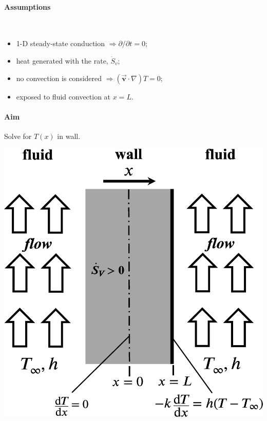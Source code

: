 \documentclass[12pt, a4paper]{article}
\numberwithin{equation}{subsection}
\begin{document}
\begin{tcolorbox}[breakable, title = \textbf{Example: Internal Heat Generation}]
\begin{minipage}{.6\textwidth}
    \paragraph{Assumptions} \ \\
    \begin{itemize}
        \item 1-D steady-state conduction  $\Rightarrow \partial / \partial t = 0$;
        \item heat generated with the rate, $\dot{S}_{v}$;
        \item no convection is considered $\Rightarrow (\vec{\bm{v}} \cdot \nabla) T = 0$;
        \item exposed to fluid convection at $x=L$.
    \end{itemize}
    \paragraph{Aim} Solve for $T(x)$ in wall.
\end{minipage}
\begin{minipage}{.4\textwidth}
    \includegraphics[width=\textwidth]{img/internal_heat_gen.eps}
\end{minipage}


\end{tcolorbox}
\end{document}
